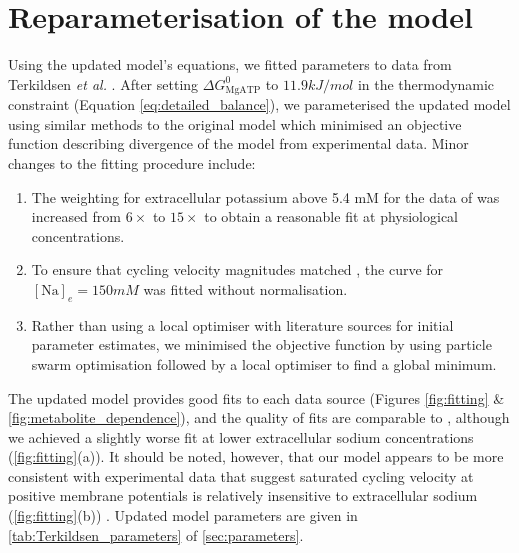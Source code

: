 \documentclass[11pt]{article}
\newcounter{num}
\begin{document}
\section{Reparameterisation of the model}
\label{sec:raparameterisation}
Using the updated model's equations, we fitted parameters to data from Terkildsen \textit{et al.} \citep{terkildsen_balance_2007,terkildsen_modelling_2006}. After setting $\Delta G_\mathrm{MgATP}^0$ to $11.9\si{kJ/mol}$ in the thermodynamic constraint (Equation \eqref{eq:detailed_balance}), we parameterised the updated model using similar methods to the original model \citet{terkildsen_modelling_2006} which minimised an objective function describing divergence of the model from experimental data. Minor changes to the fitting procedure include:
\begin{enumerate}
	\item The weighting for extracellular potassium above 5.4 mM for the data of \citet{nakao_[na]_1989} was increased from $6\times$ to $15\times$ to obtain a reasonable fit at physiological concentrations.
	\item To ensure that cycling velocity magnitudes matched \citet{nakao_[na]_1989}, the curve for $[\mathrm{Na}]_e=150 \si{mM}$ was fitted without normalisation.
	\item Rather than using a local optimiser with literature sources for initial parameter estimates, we minimised the objective function by using particle swarm optimisation \citep{kennedy_particle_1995} followed by a local optimiser to find a global minimum.
\end{enumerate}
The updated model provides good fits to each data source (Figures \ref{fig:fitting} \& \ref{fig:metabolite_dependence}), and the quality of fits are comparable to \citet{terkildsen_modelling_2006}, although we achieved a slightly worse fit at lower extracellular sodium concentrations (\autoref{fig:fitting}(a)). It should be noted, however, that our model appears to be more consistent with experimental data that suggest saturated cycling velocity at positive membrane potentials is relatively insensitive to extracellular sodium (\autoref{fig:fitting}(b)) \citep{nakao_[na]_1989}. Updated model parameters are given in \autoref{tab:Terkildsen_parameters} of \autoref{sec:parameters}.
\end{document}
